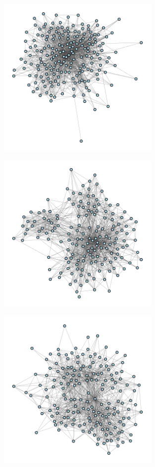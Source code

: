 \documentclass[12pt]{article}
\begin{document}
\begin{appendix}
\begin{figure}
  \includegraphics[width=0.7\textwidth]{../3_results/town_7.png} \\
\end{figure}
\begin{figure}
  \centering
  \caption{\protect}
  \includegraphics[width=0.7\textwidth]{../3_results/town_8.png} \\
\end{figure}
\begin{figure}
  \centering
  \caption{\protect}
  \includegraphics[width=0.7\textwidth]{../3_results/town_9.png} \\

\end{figure}
\end{appendix}
\end{document}

